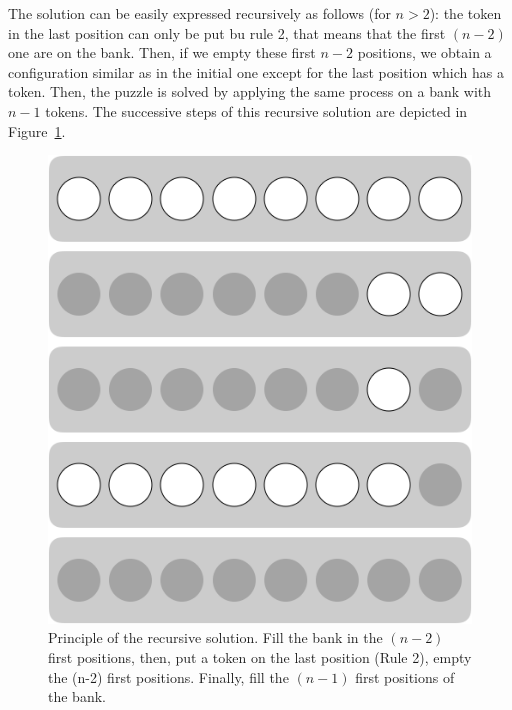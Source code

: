 The solution can be easily expressed recursively as follows (for $n > 2$):
the token in the last position can only be put bu rule 2, that means that the first $(n-2)$ one are on the bank.
Then, if we empty these first $n-2$ positions,
we obtain a configuration similar as in the initial one except for the last position which has a token. 
Then, the puzzle is solved by applying the same process on a bank with $n-1$ tokens.
The successive steps of this recursive solution are depicted in Figure~\ref{fig:jeujetonsPrinciple}.


\begin{figure}[h]
\begin{center}
        \includegraphics[scale=0.4]{FiguresMaths/GameTokenPrinciple.png}
        \caption{Principle of the recursive solution. Fill the bank in the $(n-2)$ first positions, then, put a token on the last position (Rule 2), 
        empty the (n-2) first positions. Finally, fill the $(n-1)$ first positions of the bank.}
        \label{fig:jeujetonsPrinciple}
\end{center}
\end{figure}
\bigskip

